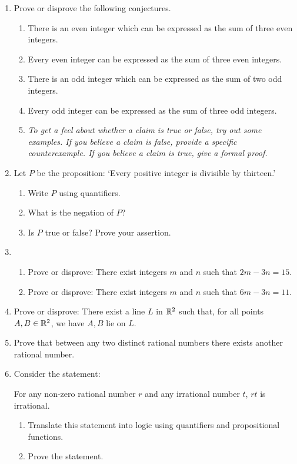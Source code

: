 \begin{exercises}{}{}
\begin{enumerate}
	
	
  \item Prove or disprove the following conjectures.
	\begin{enumerate}
	  \item There is an even integer which can be expressed as the sum of three even integers.
	  \item Every even integer can be expressed as the sum of three even integers. 
	  \item There is an odd integer which can be expressed as the sum of two odd integers.
	  \item Every odd integer can be expressed as the sum of three odd integers.
		\item[]\emph{To get a feel about whether a claim is true or false, try out some examples. If you believe a claim is false, provide a specific counterexample. If you believe a claim is true, give a formal proof.}
\end{enumerate}

	\item Let $P$ be the proposition: `Every positive integer is divisible by thirteen.'    \begin{enumerate}
      \item Write $P$ using quantifiers.
      \item What is the negation of $P$?
      \item Is $P$ true or false? Prove your assertion.
    \end{enumerate}

	\item \begin{enumerate} \item Prove or disprove: There exist integers $m$ and $n$ such that $2m-3n=15$. 
	\item Prove or disprove: There exist integers $m$ and $n$ such that $6m-3n=11$. 
  \end{enumerate}

  \item Prove or disprove: There exist a line $L$ in $\mathbb{R}^2$ such that, for all points $A, B \in \mathbb{R}^2$, we have $A, B$ lie on $L$. 

  
	\item Prove that between any two distinct rational numbers there exists another rational number.\label{ex:rationalsdenseinthemselves}
	
	  \item Consider the statement:
  \begin{center}
      For any non-zero rational number $r$ and any irrational number $t$, $rt$ is irrational.
  \end{center}
  \begin{enumerate}
      \item Translate this statement into logic using quantifiers and propositional functions.
      \item Prove the statement.
  \end{enumerate}


\end{enumerate}
\end{exercises}
